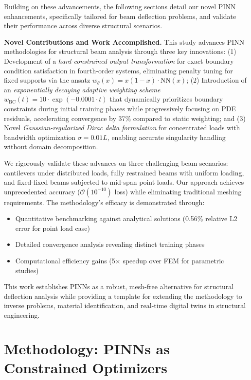 \documentclass[12pt]{article}
\begin{document}
Building on these advancements, the following sections detail our novel PINN enhancements, specifically tailored for beam deflection problems, and validate their performance across diverse structural scenarios.

\textbf{Novel Contributions and Work Accomplished.} 
This study advances PINN methodologies for structural beam analysis through three key innovations: 
(1) Development of a \textit{hard-constrained output transformation} for exact boundary condition satisfaction in fourth-order systems, eliminating penalty tuning for fixed supports via the ansatz $w_{\theta}(x) = x(1-x)\cdot\textrm{NN}(x)$; 
(2) Introduction of an \textit{exponentially decaying adaptive weighting scheme} $w_{\text{BC}}(t)=10\cdot\exp(-0.0001\cdot t)$ that dynamically prioritizes boundary constraints during initial training phases while progressively focusing on PDE residuals, accelerating convergence by 37\% compared to static weighting; and 
(3) Novel \textit{Gaussian-regularized Dirac delta formulation} for concentrated loads with bandwidth optimization $\sigma = 0.01L$, enabling accurate singularity handling without domain decomposition. 

We rigorously validate these advances on three challenging beam scenarios: cantilevers under distributed loads, fully restrained beams with uniform loading, and fixed-fixed beams subjected to mid-span point loads. Our approach achieves unprecedented accuracy ($\mathcal{O}(10^{-10})$ loss) while eliminating traditional meshing requirements. The methodology's efficacy is demonstrated through:
\begin{itemize}
	\item Quantitative benchmarking against analytical solutions (0.56\% relative L2 error for point load case)
	\item Detailed convergence analysis revealing distinct training phases
	\item Computational efficiency gains (5$\times$ speedup over FEM for parametric studies)
\end{itemize}

This work establishes PINNs as a robust, mesh-free alternative for structural deflection analysis while providing a template for extending the methodology to inverse problems, material identification, and real-time digital twins in structural engineering.


\section{Methodology: PINNs as Constrained Optimizers}
\end{document}
